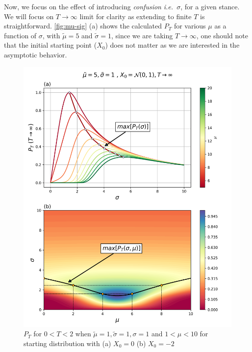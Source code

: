 \documentclass[aps,prl,twocolumn,showpacs,final]{revtex4-1}
\newcommand{\ie}{\textit{i.e.\ }}
\begin{document}
Now, we focus on the effect of introducing \textit{confusion} \ie $\sigma$, for a given stance. We will focus on $T\rightarrow\infty$ limit for clarity as extending to finite $T$ is straightforward. \autoref{fig:mu-sig} (a) shows the calculated $P_T$ for various $\mu$ as a function of $\sigma$, with $\tilde{\mu}=5$ and $\tilde{\sigma}=1$, since we are taking $T\rightarrow\infty$, one should note that the initial starting point ($X_0$) does not matter as we are interested in the asymptotic behavior.
\begin{figure}[htbp]
\includegraphics[width=\columnwidth]{mu-sig.png}
\caption{ $P_T$ for $0<T<2$ when $\tilde{\mu}=1,\tilde{\sigma}=1,\sigma=1$ and $1<\mu<10$ for starting distribution with (a) $X_0=0$ (b) $X_0=-2$ }
\label{fig:mu-sig}
\end{figure}
\end{document}
